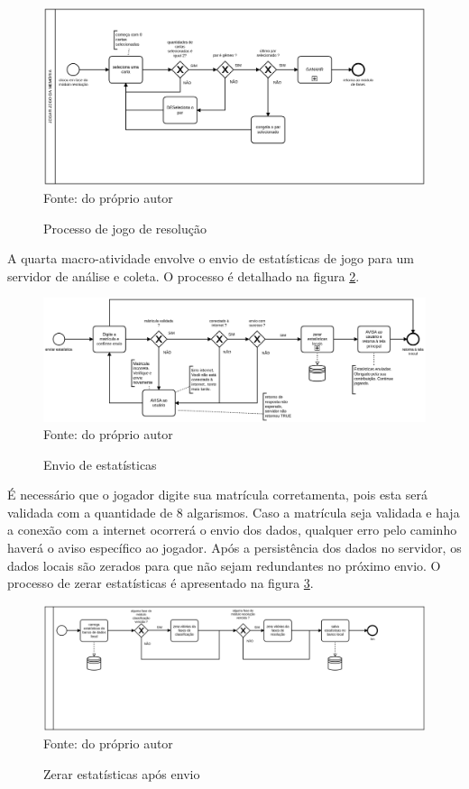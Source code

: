 \begin{figure}[H]
\centering
\caption{Processo de jogo de resolução}
\includegraphics[scale=0.15]{figuras/processos/processo_resolucao.png}
\label{res_proc}
\small{Fonte: do próprio autor}
\end{figure}

A quarta macro-atividade envolve o envio de estatísticas de jogo para um servidor de análise e coleta. O processo é detalhado na figura \ref{envio_estatisticas}.

\begin{figure}[H]
\centering
\caption{Envio de estatísticas}
\includegraphics[width=\textwidth,height=\textheight,keepaspectratio]{figuras/processos/processo_enviar_estatisticas.png}
\label{envio_estatisticas}
\small{Fonte: do próprio autor}
\end{figure}

É necessário que o jogador digite sua matrícula corretamenta, pois esta será validada com a quantidade de 8 algarismos. Caso a matrícula seja validada e haja a conexão com a internet ocorrerá o envio dos dados, qualquer erro pelo caminho haverá o aviso específico ao jogador. Após a persistência dos dados no servidor, os dados locais são zerados para que não sejam redundantes no próximo envio. O processo de zerar estatísticas é apresentado na figura \ref{zerar_estatisticas}. 

\begin{figure}[H]
\centering
\caption{Zerar estatísticas após envio}
\includegraphics[width=\textwidth,height=\textheight,keepaspectratio]{figuras/processos/processo_zerar_estatisticas.png}
\label{zerar_estatisticas}
\small{Fonte: do próprio autor}
\end{figure}

